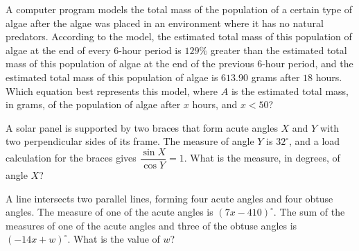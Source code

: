 \noindent\markforreview
\vspace{1em}

A computer program models the total mass of the population of a certain type of algae after the algae was placed in an environment where it has no natural predators. According to the model, the estimated total mass of this population of algae at the end of every 6-hour period is \(129\%\) greater than the estimated total mass of this population of algae at the end of the previous 6-hour period, and the estimated total mass of this population of algae is \(613.90\) grams after \(18\) hours.
Which equation best represents this model, where \(A\) is the estimated total mass, in grams, of the population of algae after \(x\) hours, and \(x < 50\)?

\vspace{0.75em}


\vspace{2em}
\newpage

\noindent\markforreview
\vspace{1em}

A solar panel is supported by two braces that form acute angles \(X\) and \(Y\) with two perpendicular sides of its frame. The measure of angle \(Y\) is \(32^\circ\), and a load calculation for the braces gives \(\dfrac{\sin X}{\cos Y}=1\).
What is the measure, in degrees, of angle \(X\)?

\vspace{0.75em}


\vspace{2em}
\newpage

\noindent\markforreview
\vspace{1em}

A line intersects two parallel lines, forming four acute angles and four obtuse angles. The measure of one of the acute angles is \((7x - 410)^\circ\). The sum of the measures of one of the acute angles and three of the obtuse angles is \((-14x + w)^\circ\).
What is the value of \(w\)?

\vspace{2em}
\newpage

\noindent\markforreview
\vspace{1em}

